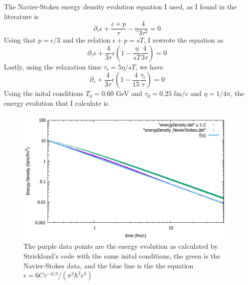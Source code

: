 \documentclass{article}
\begin{document}
	The Navier-Stokes energy density evolution equation I used, as I found in the literature is 
	\begin{equation}
		\partial_\tau \epsilon + \frac{\epsilon + p}{\tau} - \eta\frac{4}{3\tau^2} = 0
	\end{equation}
	Using that $p = \epsilon/3$ and the relation $\epsilon + p = sT$, I rewrote the equation as 
	\begin{equation}
		\partial_\tau \epsilon + \frac{4}{3\tau}\epsilon\left(1-\frac{\eta}{sT}\frac{4}{3\tau}\right)= 0
	\end{equation}
	Lastly, using the relaxation time $\tau_\mathrm{r} = 5\eta/sT$, we have
	\begin{equation}
		\partial_\tau +\frac{4}{3\tau}\epsilon\left(1-\frac{4}{15}\frac{\tau_\mathrm{r}}{\tau}\right) = 0
	\end{equation}
	Using the inital conditions $T_0 = 0.60$ GeV and $\tau_0 = 0.25$ fm/c and $\eta = 1/4\pi$, the energy evolution that I calculate is 
	\begin{figure}[h]
		\centering
		\includegraphics[width=.85\textwidth]{Navier-Stokes.pdf}
		\caption{The purple data points are the energy evolution as calculated by Strickland's code with the same inital conditions, the green is the Navier-Stokes data, and the blue line is the the equation $\epsilon = 6C\tau^{-4/3}/(\pi^2\hbar^3c^3)$}
	\end{figure}
	
\end{document}
